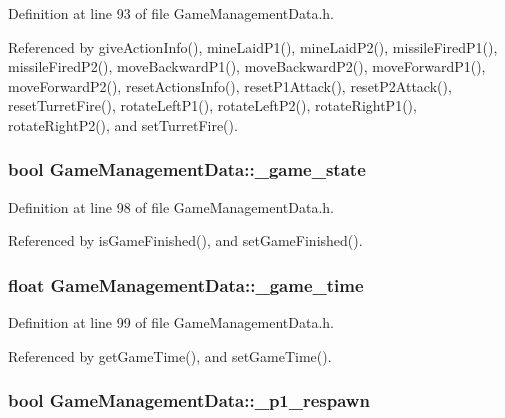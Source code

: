 Definition at line 93 of file Game\-Management\-Data.\-h.



Referenced by give\-Action\-Info(), mine\-Laid\-P1(), mine\-Laid\-P2(), missile\-Fired\-P1(), missile\-Fired\-P2(), move\-Backward\-P1(), move\-Backward\-P2(), move\-Forward\-P1(), move\-Forward\-P2(), reset\-Actions\-Info(), reset\-P1\-Attack(), reset\-P2\-Attack(), reset\-Turret\-Fire(), rotate\-Left\-P1(), rotate\-Left\-P2(), rotate\-Right\-P1(), rotate\-Right\-P2(), and set\-Turret\-Fire().

\hypertarget{classGameManagementData_a9b7ff181d9a1df074a9d2ff0dea435df}{
\subsubsection[{\-\_\-game\-\_\-state}]{\setlength{\rightskip}{0pt plus 5cm}bool Game\-Management\-Data\-::\-\_\-game\-\_\-state\hspace{0.3cm}{\ttfamily [private]}}}\label{classGameManagementData_a9b7ff181d9a1df074a9d2ff0dea435df}


Definition at line 98 of file Game\-Management\-Data.\-h.



Referenced by is\-Game\-Finished(), and set\-Game\-Finished().

\hypertarget{classGameManagementData_aab72e0664819cafeaa49f2fc2ec73a1a}{
\subsubsection[{\-\_\-game\-\_\-time}]{\setlength{\rightskip}{0pt plus 5cm}float Game\-Management\-Data\-::\-\_\-game\-\_\-time\hspace{0.3cm}{\ttfamily [private]}}}\label{classGameManagementData_aab72e0664819cafeaa49f2fc2ec73a1a}


Definition at line 99 of file Game\-Management\-Data.\-h.



Referenced by get\-Game\-Time(), and set\-Game\-Time().

\hypertarget{classGameManagementData_aa7c7d0776da7b60a01188141ac32cdfa}{
\subsubsection[{\-\_\-p1\-\_\-respawn}]{\setlength{\rightskip}{0pt plus 5cm}bool Game\-Management\-Data\-::\-\_\-p1\-\_\-respawn\hspace{0.3cm}{\ttfamily [private]}}}\label{classGameManagementData_aa7c7d0776da7b60a01188141ac32cdfa}



